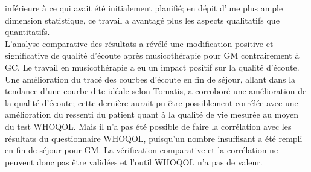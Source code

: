  inférieure à ce qui avait été initialement planifié;  en dépit d'une plus ample dimension statistique, ce 
 travail a avantagé plus les aspects qualitatifs que quantitatifs.
   \\
  L'analyse comparative des résultats a révélé une modification positive et significative 
 de qualité d'écoute après musicothérapie 
 pour GM contrairement à GC. 
 Le travail en musicothérapie a
 eu un impact positif sur la qualité d'écoute.
Une amélioration du tracé des courbes d'écoute en 
fin de séjour, allant dans la tendance d'une courbe dite idéale selon Tomatis, a corroboré une 
amélioration de la qualité d'écoute; cette dernière aurait pu être possiblement corrélée avec une 
amélioration du ressenti du patient quant à 
la qualité de vie mesurée au moyen du test WHOQOL.
Mais il n'a pas été possible de faire la corrélation avec les résultats du questionnaire WHOQOL, 
puisqu'un nombre insuffisant a été rempli en fin de séjour pour GM. 
La vérification comparative et la corrélation ne peuvent donc pas être validées et l'outil WHOQOL n'a pas 
de valeur.
 
